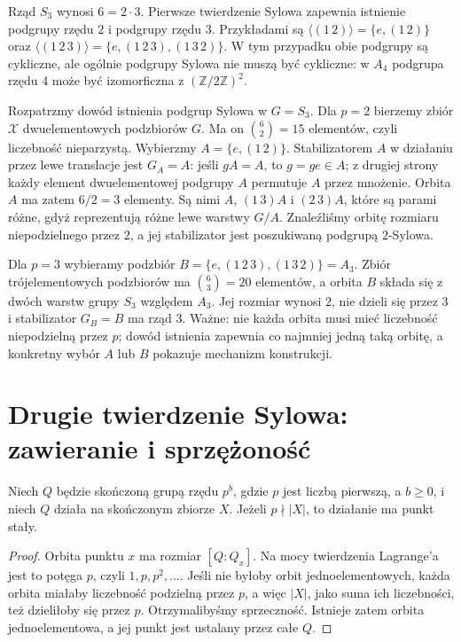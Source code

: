 \begin{przyklad}
Rząd $S_3$ wynosi $6=2\cdot3$.
Pierwsze twierdzenie Sylowa zapewnia istnienie podgrupy rzędu $2$
i podgrupy rzędu $3$.
Przykładami są
$\langle(1\,2)\rangle=\{e,(1\,2)\}$
oraz $\langle(1\,2\,3)\rangle=\{e,(1\,2\,3),(1\,3\,2)\}$.
W tym przypadku obie podgrupy są cykliczne,
ale ogólnie podgrupy Sylowa nie muszą być cykliczne:
w $A_4$ podgrupa rzędu $4$ może być izomorficzna
z $(\mathbb Z/2\mathbb Z)^2$.
\end{przyklad}

\begin{przyklad}
\label{aa:prz:sylow-stabilizator-s3}
Rozpatrzmy dowód istnienia podgrup Sylowa w $G=S_3$.
Dla $p=2$ bierzemy zbiór $\mathcal X$ dwuelementowych
podzbiorów $G$. Ma on $\binom62=15$ elementów,
czyli liczebność nieparzystą.
Wybierzmy $A=\{e,(1\,2)\}$.
Stabilizatorem $A$ w działaniu przez lewe translacje jest
$G_A=A$: jeśli $gA=A$, to $g=ge\in A$; z drugiej strony
każdy element dwuelementowej podgrupy $A$ permutuje $A$
przez mnożenie. Orbita $A$ ma zatem $6/2=3$ elementy.
Są nimi $A$, $(1\,3)A$ i $(2\,3)A$, które są parami
różne, gdyż reprezentują różne lewe warstwy $G/A$.
Znaleźliśmy orbitę rozmiaru niepodzielnego przez $2$,
a jej stabilizator jest poszukiwaną podgrupą $2$-Sylowa.

Dla $p=3$ wybieramy podzbiór
$B=\{e,(1\,2\,3),(1\,3\,2)\}=A_3$.
Zbiór trójelementowych podzbiorów ma $\binom63=20$
elementów, a orbita $B$ składa się z dwóch warstw grupy
$S_3$ względem $A_3$. Jej rozmiar wynosi $2$,
nie dzieli się przez $3$ i stabilizator $G_B=B$
ma rząd $3$. Ważne: nie każda orbita musi mieć liczebność
niepodzielną przez $p$; dowód istnienia zapewnia
co najmniej jedną taką orbitę, a konkretny wybór
$A$ lub $B$ pokazuje mechanizm konstrukcji.
\end{przyklad}

\section{Drugie twierdzenie Sylowa: zawieranie i sprzężoność}
\begin{lemat}
\label{aa:lem:orbity-pgrupy}
Niech $Q$ będzie skończoną grupą rzędu $p^b$, gdzie $p$
jest liczbą pierwszą, a $b\ge0$, i niech $Q$ działa
na skończonym zbiorze $X$.
Jeżeli $p\nmid|X|$, to działanie ma punkt stały.
\end{lemat}
\begin{proof}
Orbita punktu $x$ ma rozmiar $[Q:Q_x]$.
Na mocy twierdzenia Lagrange'a jest to potęga $p$,
czyli $1,p,p^2,\ldots$.
Jeśli nie byłoby orbit jednoelementowych, każda orbita
miałaby liczebność podzielną przez $p$,
a więc $|X|$, jako suma ich liczebności,
też dzieliłoby się przez $p$. Otrzymalibyśmy sprzeczność.
Istnieje zatem orbita jednoelementowa,
a jej punkt jest ustalany przez całe $Q$.
\end{proof}

